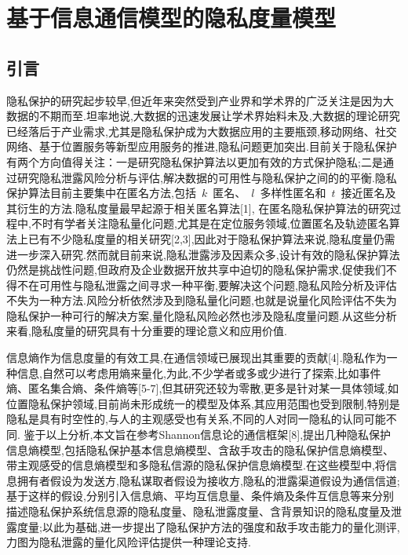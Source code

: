 \chapter{基于信息通信模型的隐私度量模型}
\label{chap:entropy-metric-model}

\section{引言}

隐私保护的研究起步较早,但近年来突然受到产业界和学术界的广泛关注是因为大数据的不期而至.坦率地说,大数据的迅速发展让学术界始料未及,大数据的理论研究已经落后于产业需求,尤其是隐私保护成为大数据应用的主要瓶颈,移动网络、社交网络、基于位置服务等新型应用服务的推进,隐私问题更加突出.目前关于隐私保护有两个方向值得关注：一是研究隐私保护算法以更加有效的方式保护隐私;二是通过研究隐私泄露风险分析与评估,解决数据的可用性与隐私保护之间的的平衡.隐私保护算法目前主要集中在匿名方法,包括~$k$~匿名、~$l$~多样性匿名和~$t$~接近匿名及其衍生的方法.隐私度量最早起源于相关匿名算法[1], 在匿名隐私保护算法的研究过程中,不时有学者关注隐私量化问题,尤其是在定位服务领域,位置匿名及轨迹匿名算法上已有不少隐私度量的相关研究[2,3],因此对于隐私保护算法来说,隐私度量仍需进一步深入研究.然而就目前来说,隐私泄露涉及因素众多,设计有效的隐私保护算法仍然是挑战性问题,但政府及企业数据开放共享中迫切的隐私保护需求,促使我们不得不在可用性与隐私泄露之间寻求一种平衡,要解决这个问题,隐私风险分析及评估不失为一种方法.风险分析依然涉及到隐私量化问题,也就是说量化风险评估不失为隐私保护一种可行的解决方案,量化隐私风险必然也涉及隐私度量问题.从这些分析来看,隐私度量的研究具有十分重要的理论意义和应用价值.

信息熵作为信息度量的有效工具,在通信领域已展现出其重要的贡献[4].隐私作为一种信息,自然可以考虑用熵来量化,为此,不少学者或多或少进行了探索,比如事件熵、匿名集合熵、条件熵等[5-7],但其研究还较为零散,更多是针对某一具体领域,如位置隐私保护领域,目前尚未形成统一的模型及体系,其应用范围也受到限制,特别是隐私是具有时空性的,与人的主观感受也有关系,不同的人对同一隐私的认同可能不同. 鉴于以上分析,本文旨在参考Shannon信息论的通信框架[8],提出几种隐私保护信息熵模型,包括隐私保护基本信息熵模型、含敌手攻击的隐私保护信息熵模型、带主观感受的信息熵模型和多隐私信源的隐私保护信息熵模型.在这些模型中,将信息拥有者假设为发送方,隐私谋取者假设为接收方,隐私的泄露渠道假设为通信信道;基于这样的假设,分别引入信息熵、平均互信息量、条件熵及条件互信息等来分别描述隐私保护系统信息源的隐私度量、隐私泄露度量、含背景知识的隐私度量及泄露度量;以此为基础,进一步提出了隐私保护方法的强度和敌手攻击能力的量化测评,力图为隐私泄露的量化风险评估提供一种理论支持.

